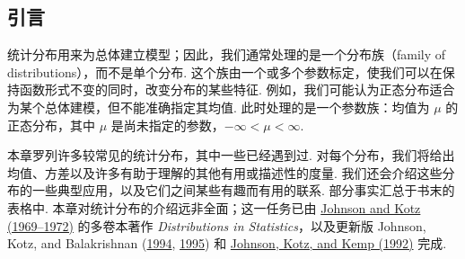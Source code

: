 \subsection{引言}\label{sec:3.1}
统计分布用来为总体建立模型；因此，我们通常处理的是一个分布族（family of distributions），而不是单个分布. 这个族由一个或多个参数标定，使我们可以在保持函数形式不变的同时，改变分布的某些特征. 例如，我们可能认为正态分布适合为某个总体建模，但不能准确指定其均值. 此时处理的是一个参数族：均值为 $\mu$ 的正态分布，其中 $\mu$ 是尚未指定的参数，$-\infty<\mu<\infty$.

本章罗列许多较常见的统计分布，其中一些已经遇到过. 对每个分布，我们将给出均值、方差以及许多有助于理解的其他有用或描述性的度量. 我们还会介绍这些分布的一些典型应用，以及它们之间某些有趣而有用的联系. 部分事实汇总于书末的表格中. 本章对统计分布的介绍远非全面；这一任务已由 \hyperref[bib:source177]{Johnson and Kotz (1969–1972)} 的多卷本著作 \textit{Distributions in Statistics}，以及更新版 Johnson, Kotz, and Balakrishnan (\hyperref[bib:source178]{1994}, \hyperref[bib:source179]{1995}) 和 \hyperref[bib:source180]{Johnson, Kotz, and Kemp (1992)} 完成.
